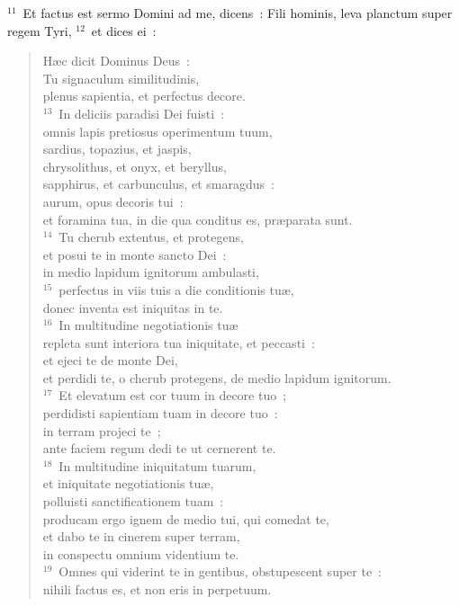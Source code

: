 ${}^{11}$~Et factus est sermo Domini ad me, dicens~: Fili hominis, leva planctum super regem Tyri,
${}^{12}$~et dices ei~: \begin{flushleft}\begin{verse}H\ae c dicit Dominus Deus~:\\ Tu signaculum similitudinis,\\ plenus sapientia, et perfectus decore.\\
${}^{13}$~In deliciis paradisi Dei fuisti~:\\ omnis lapis pretiosus operimentum tuum,\\ sardius, topazius, et jaspis,\\ chrysolithus, et onyx, et beryllus,\\ sapphirus, et carbunculus, et smaragdus~:\\ aurum, opus decoris tui~:\\ et foramina tua, in die qua conditus es, pr\ae parata sunt.\\
${}^{14}$~Tu cherub extentus, et protegens,\\ et posui te in monte sancto Dei~:\\ in medio lapidum ignitorum ambulasti,\\
${}^{15}$~perfectus in viis tuis a die conditionis tu\ae ,\\ donec inventa est iniquitas in te.\\
${}^{16}$~In multitudine negotiationis tu\ae \\ repleta sunt interiora tua iniquitate, et peccasti~:\\ et ejeci te de monte Dei,\\ et perdidi te, o cherub protegens, de medio lapidum ignitorum.\\
${}^{17}$~Et elevatum est cor tuum in decore tuo~;\\ perdidisti sapientiam tuam in decore tuo~:\\ in terram projeci te~;\\ ante faciem regum dedi te ut cernerent te.\\
${}^{18}$~In multitudine iniquitatum tuarum,\\ et iniquitate negotiationis tu\ae ,\\ polluisti sanctificationem tuam~:\\ producam ergo ignem de medio tui, qui comedat te,\\ et dabo te in cinerem super terram,\\ in conspectu omnium videntium te.\\
${}^{19}$~Omnes qui viderint te in gentibus, obstupescent super te~:\\ nihili factus es, et non eris in perpetuum.\end{verse}\end{flushleft}


